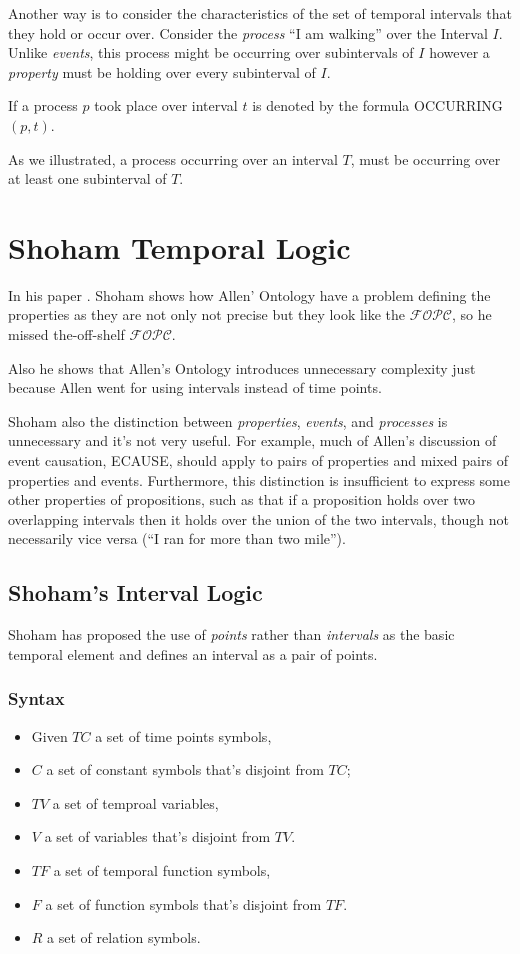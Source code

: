 Another way is to consider the characteristics of the set of temporal intervals that they hold or occur over.
Consider the \textit{process} ``I am walking'' over the Interval $I$. Unlike \textit{events}, this process might be occurring over subintervals of $I$ however a \textit{property} must be holding over every subinterval of $I$.


If a process $p$ took place over interval $t$ is denoted by the formula OCCURRING$(p,t)$.


As we illustrated, a process occurring over an interval $T$, must be occurring over at least one subinterval of $T$.

\section{Shoham Temporal Logic}

In his paper \cite{shoham1988temporal}.
Shoham shows how Allen' Ontology have a problem defining the properties as they are not only not precise but they look like the $\mathcal{FOPC}$, so he missed the-off-shelf $\mathcal{FOPC}$.

Also he shows that Allen's Ontology introduces unnecessary complexity just because Allen went for using intervals instead of time points.

Shoham also the distinction between \textit{properties}, \textit{events}, and \textit{processes} is unnecessary and it's not very useful.
For example, much of Allen's discussion of event causation, ECAUSE, should apply to pairs of properties and mixed pairs of properties and events. Furthermore, this distinction is insufficient to express some other properties of propositions, such as that if a proposition holds over two overlapping intervals then it holds over
the union of the two intervals, though not necessarily vice versa (``I ran for more than two mile'').


\subsection{Shoham's Interval Logic}
Shoham has proposed the use of \textit{points} rather than \textit{intervals} as the basic temporal element and defines an interval as a pair of points.
\subsubsection{Syntax}
\begin{itemize}
	\item Given $TC$ a set of time points symbols,
	\item $C$ a set of constant symbols that's disjoint from $TC$;
	\item $TV$ a set of temproal variables,
	\item $V$ a set of variables that's disjoint from $TV$.
	\item $TF$ a set of temporal function symbols,
	\item $F$ a set of function symbols that's disjoint from $TF$.
	\item $R$ a set of relation symbols.
\end{itemize}

